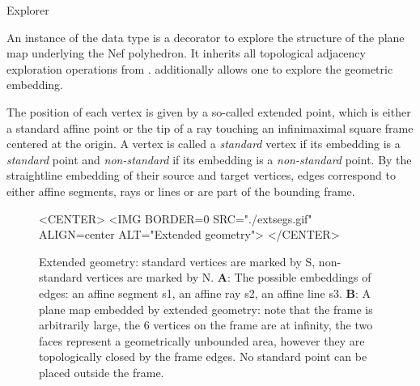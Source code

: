 
\begin{ccRefClass}{Explorer}

\ccDefinition

An instance  of the data type  is a decorator to
explore the structure of the plane map underlying the Nef
polyhedron. It inherits all topological adjacency exploration
operations from . 
additionally allows one to explore the geometric embedding.

The position of each vertex is given by a so-called extended point,
which is either a standard affine point or the tip of a ray touching
an infinimaximal square frame centered at the origin. A vertex 
is called a \emph{standard} vertex if its embedding is a
\emph{standard} point and \emph{non-standard} if its embedding is a
\emph{non-standard} point. By the straightline embedding of their
source and target vertices, edges correspond to either affine
segments, rays or lines or are part of the bounding frame.

\begin{figure}[htbp]
\begin{ccTexOnly}
\begin{center}
\end{center}
\end{ccTexOnly}
\caption{Extended geometry: standard vertices are marked
by S, non-standard vertices are marked by N. \textbf{A}: The possible
embeddings of edges: an affine segment s1, an affine ray s2, an affine
line s3. \textbf{B}: A plane map embedded by extended geometry: note
that the frame is arbitrarily large, the 6 vertices on the frame are
at infinity, the two faces represent a geometrically unbounded area,
however they are topologically closed by the frame edges. No standard
point can be placed outside the frame.}\label{extsegs}
\begin{ccHtmlOnly}
<CENTER>
<IMG BORDER=0 SRC="./extsegs.gif" ALIGN=center
ALT="Extended geometry">
</CENTER>
\end{ccHtmlOnly}
\end{figure}      


\end{ccRefClass}
